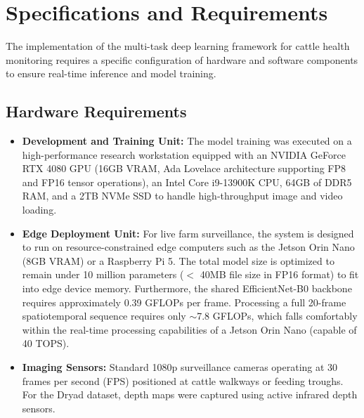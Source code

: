 \section{Specifications and Requirements}
The implementation of the multi-task deep learning framework for cattle health monitoring requires a specific configuration of hardware and software components to ensure real-time inference and model training.

\subsection{Hardware Requirements}
\begin{itemize}
    \item \textbf{Development and Training Unit:} The model training was executed on a high-performance research workstation equipped with an NVIDIA GeForce RTX 4080 GPU (16GB VRAM, Ada Lovelace architecture supporting FP8 and FP16 tensor operations), an Intel Core i9-13900K CPU, 64GB of DDR5 RAM, and a 2TB NVMe SSD to handle high-throughput image and video loading.
    \item \textbf{Edge Deployment Unit:} For live farm surveillance, the system is designed to run on resource-constrained edge computers such as the Jetson Orin Nano (8GB VRAM) or a Raspberry Pi 5. The total model size is optimized to remain under 10 million parameters ($<$ 40MB file size in FP16 format) to fit into edge device memory. Furthermore, the shared EfficientNet-B0 backbone requires approximately 0.39 GFLOPs per frame. Processing a full 20-frame spatiotemporal sequence requires only $\sim$7.8 GFLOPs, which falls comfortably within the real-time processing capabilities of a Jetson Orin Nano (capable of 40 TOPS).
    \item \textbf{Imaging Sensors:} Standard 1080p surveillance cameras operating at 30 frames per second (FPS) positioned at cattle walkways or feeding troughs. For the Dryad dataset, depth maps were captured using active infrared depth sensors.
\end{itemize}

